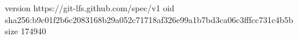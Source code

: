 version https://git-lfs.github.com/spec/v1
oid sha256:b9c01f2b6c2083168b29a052c71718af326e99a1b7bd3ca06c3fffcc731c4b5b
size 174940

